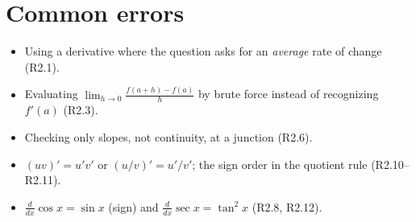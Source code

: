 \documentclass{apcalc}
\begin{document}
\section{Common errors}
\begin{itemize}
\item Using a derivative where the question asks for an \emph{average} rate of change (R2.1).
\item Evaluating $\lim_{h\to0}\frac{f(a+h)-f(a)}{h}$ by brute force instead of recognizing $f'(a)$ (R2.3).
\item Checking only slopes, not continuity, at a junction (R2.6).
\item $(uv)'=u'v'$ or $(u/v)'=u'/v'$; the sign order in the quotient rule (R2.10--R2.11).
\item $\frac{d}{dx}\cos x=\sin x$ (sign) and $\frac{d}{dx}\sec x=\tan^2 x$ (R2.8, R2.12).
\end{itemize}
\end{document}

